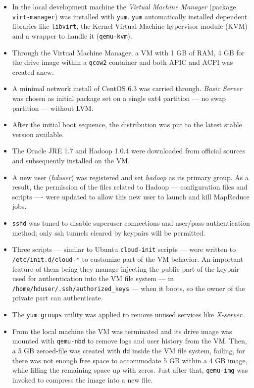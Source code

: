\begin{itemize}
 \item In the local development machine the \emph{Virtual Machine Manager} (package \texttt{virt-manager}) was installed with \texttt{yum}. \texttt{yum} automatically installed dependent libraries like \texttt{libvirt}, the Kernel Virtual Machine hypervisor module (KVM) and a wrapper to handle it (\texttt{qemu-kvm}).
 \item Through the Virtual Machine Manager, a VM with 1 GB of RAM, 4 GB for the drive image within a \texttt{qcow2} container and both APIC and ACPI was created anew.
 \item A minimal network install of CentOS 6.3 was carried through. \emph{Basic Server} was chosen as initial package set on a single ext4 partition --- no swap partition --- without LVM.
 \item After the initial boot sequence, the distribution was put to the latest stable version available.
 \item The Oracle JRE 1.7 and Hadoop 1.0.4 were downloaded from official sources and subsequently installed on the VM.
 \item A new user (\emph{hduser}) was registered and set \emph{hadoop} as its primary group. As a result, the permission of the files related to Hadoop --- configuration files and scripts ---- were updated to allow this new user to launch and kill MapReduce jobs.
 \item \texttt{sshd} was tuned to disable superuser connections and user/pass authentication method; only ssh tunnels cleared by keypairs will be permitted.
 \item Three scripts --- similar to Ubuntu \texttt{cloud-init} scripts --- were written to \texttt{/etc/init.d/cloud-*} to customize part of the VM behavior. An important feature of them being they manage injecting the public part of the keypair used for authentication into the VM file system --- in \texttt{/home/hduser/.ssh/authorized\_keys} --- when it boots, so the owner of the private part can authenticate.
 \item The \texttt{yum groups} utility was applied to remove unused services like \emph{X-server}.
 \item From the local machine the VM was terminated and its drive image was mounted with \texttt{qemu-nbd} to remove logs and user history from the VM. Then, a 5 GB zeroed-file was created with \texttt{dd} inside the VM file system, failing, for there was not enough free space to accommodate 5 GB within a 4 GB image, while filling the remaining space up with zeros. Just after that, \texttt{qemu-img} was invoked to compress the image into a new file.

\end{itemize}

